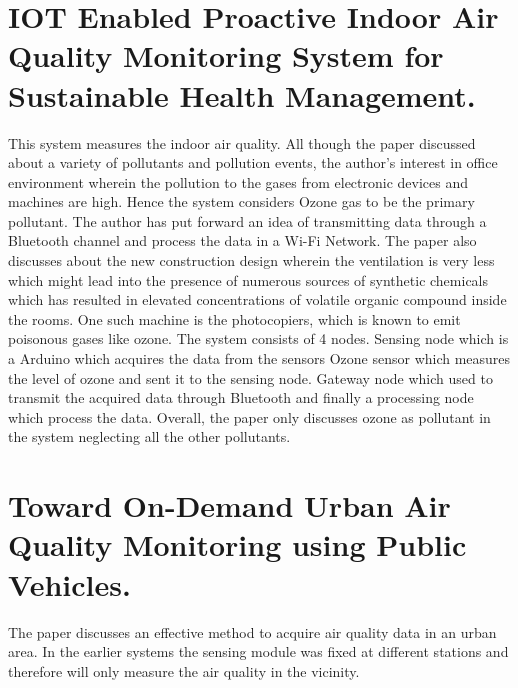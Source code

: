 \documentclass[10pt,a4paper]{report}
\begin{document}
\section{IOT Enabled Proactive Indoor Air Quality Monitoring System for Sustainable Health Management.}
This system measures the indoor air quality. All though the paper discussed about a variety of pollutants and pollution events, the author's interest in office environment wherein the pollution to the gases from electronic devices and machines are high. Hence the system considers Ozone gas to be the primary pollutant. The author has put forward an idea of transmitting data through a Bluetooth channel and process the data in a Wi-Fi Network. The paper also discusses about the new construction design wherein the ventilation is very less which might lead into the presence of numerous sources of synthetic chemicals which has resulted in elevated concentrations of volatile organic compound inside the rooms. One such machine is the photocopiers, which is known to emit poisonous gases like ozone. The system consists of 4 nodes.
Sensing node which is a Arduino which acquires the data from the sensors
Ozone sensor which measures the level of ozone and sent it to the sensing node. 
Gateway node which used to transmit the acquired data through Bluetooth and finally a processing node which process the data.
Overall, the paper only discusses ozone as pollutant in the system neglecting all the other pollutants.

\section{Toward On-Demand Urban Air Quality Monitoring using Public Vehicles.}

The paper discusses an effective method to acquire air quality data in an urban area. In the earlier systems the sensing module was fixed at different stations and therefore will only measure the air quality in the vicinity.
\end{document}
